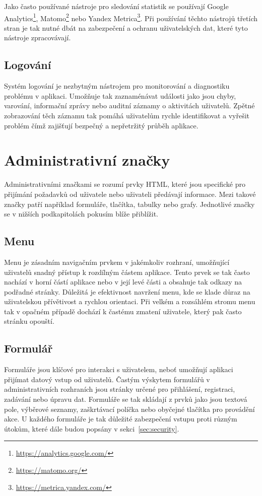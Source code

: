 Jako často používané nástroje pro sledování statistik se používají Google Analytics\footnote[4]{\url{https://analytics.google.com/}}, Matomo\footnote[5]{\url{https://matomo.org/}} nebo Yandex Metrica\footnote[6]{\url{https://metrica.yandex.com/}}. Při používání těchto nástrojů třetích stran je tak nutné dbát na zabezpečení a ochranu uživatelských dat, které tyto nástroje zpracovávají.

\subsection{Logování}
\label{subsec:admin-elements-logs}
Systém logování je nezbytným nástrojem pro monitorování a diagnostiku problému v aplikaci. Umožňuje tak zaznaménávat události jako jsou chyby, varování, informační zprávy nebo auditní záznamy o aktivitách uživatelů. Zpětné zobrazování těch záznamu tak pomáhá uživatelům rychle identifikovat a vyřešit problém čímž zajišťují bezpečný a nepřetržitý průběh aplikace.

\section{Administrativní značky}
\label{sec:admin-tags}
Administrativními značkami se rozumí prvky HTML, které jsou specifické pro přijímání požadavků od uživatele nebo uživateli předávají informace. Mezi takové značky patří například formuláře, tlačítka, tabulky nebo grafy. Jednotlivé značky se v nižších podkapitolách pokusím blíže přiblížit.

\subsection{Menu}
\label{subsec:admin-tags-menu}
Menu je zásadním navigačním prvkem v jakémkoliv rozhraní, umožňující uživatelů snadný přístup k rozdílným částem aplikace. Tento prvek se tak často nachází v horní částí aplikace nebo v její levé části a obsahuje tak odkazy na podřadné stránky. Důležitá je efektivnost navržení menu, kde se klade důraz na uživatelskou přívětivost a rychlou orientaci. Při velkém a rozsáhlém stromu menu tak v opačném případě dochází k častému zmatení uživatele, který pak často stránku opouští.

\subsection{Formulář}
\label{subsec:admin-tags-form}
Formuláře jsou klíčové pro interakci s uživatelem, neboť umožňují aplikaci přijímat datový vstup od uživatelů. Častým výskytem formulářů v administrativních rozhraních jsou stránky určené pro přihlášení, registraci, zadávání nebo úpravu dat. Formuláře se tak skládají z prvků jako jsou textová pole, výběrové seznamy, zaškrtávací políčka nebo obyčejné tlačítka pro provádění akce. U každého formuláře je tak důležité zabezpečení vstupu proti různým útokům, které dále budou popsány v sekci~\ref{sec:security}.

